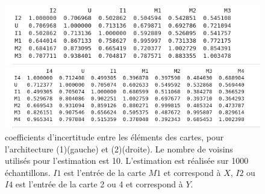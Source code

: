 \begin{figure}[h!]
\begin{minipage}{0.5\textwidth}
\includegraphics[width=\textwidth]{2som_star_im.png}
\end{minipage}
\begin{minipage}{0.5\textwidth}
\includegraphics[width=\textwidth]{2som_line4_im.png}
\end{minipage}
\caption{coefficients d'incertitude entre les éléments des cartes, pour l'architecture (1)(gauche) et (2)(droite). Le nombre de voisins utilisés pour l'estimation est 10. L'estimation est réalisée sur 1000 échantillons. $I1$ est l'entrée de la carte $M1$ et correspond à $X$,  $I2$ ou $I4$ est l'entrée de la carte 2 ou 4 et correspond à $Y$. }
\end{figure}



